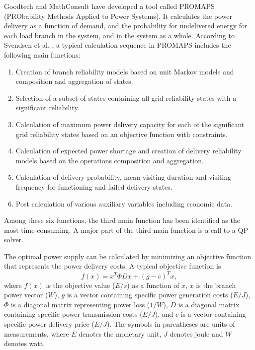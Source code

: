 \documentclass[a4paper,12pt]{report}
\begin{document}
Goodtech and MathConsult have developed a tool called PROMAPS
(PRObability Methods Applied to Power Systems). It calculates the power
delivery as a function of demand, and the probability for undelivered
energy for each load branch in the system, and in the system as a whole.
According to Svendsen et al. \cite{trond}, a typical calculation sequence
in PROMAPS includes the following main functions:
\begin{enumerate}
\item Creation of branch reliability models based on unit Markov models and
      composition and aggregation of states.
\item Selection of a subset of states containing all grid reliability states
      with a significant reliability.
\item Calculation of maximum power delivery capacity for each of the
      significant grid reliability states based on an objective function with
      constraints.
\item Calculation of expected power shortage and creation of delivery
      reliability models based on the operations composition and aggregation.
\item Calculation of delivery probability, mean visiting duration and visiting
      frequency for functioning and failed delivery states.
\item Post calculation of various auxiliary variables including economic data.
\end{enumerate}
Among these six functions, the third main function has been identified as the
most time-consuming. A major part of the third main function is a call to a
QP solver\cite{trond}.

The optimal power
supply can be calculated by minimizing an objective function that represents
the power delivery costs. A typical objective function is
\begin{equation}
f(x) = x^T \Phi D x + (g-c)^T x, \label{eq:goodtech}
\end{equation}
where $f(x)$ is the objective value ($E/s$) as a function of $x$, $x$ is the
branch power vector ($W$), $g$ is a vector containing specific power
generation costs ($E/J$), $\Phi$ is a diagonal matrix representing power loss
($1/W$), $D$ is a diagonal matrix containing specific power transmission costs
($E/J$), and $c$ is a vector containing specific power delivery price
($E/J$). The symbols in parentheses are units of measurements, where $E$
denotes the monetary unit, $J$ denotes joule and $W$ denotes
watt\cite{digernes}.
\end{document}
